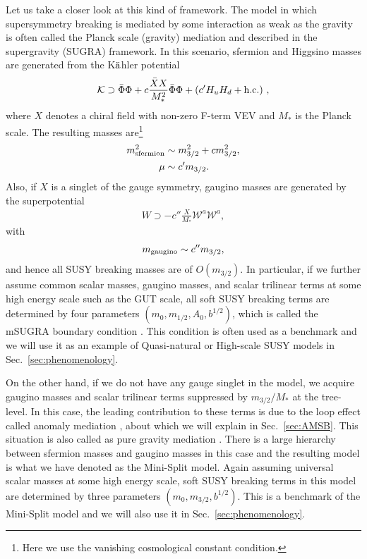 \documentclass[12pt,twoside,book]{article}
\begin{document}
Let us take a closer look at this kind of framework.  The model in which
supersymmetry breaking is mediated by some interaction as weak as the
gravity is often called the Planck scale (gravity) mediation
\cite{Chamseddine:1982jx, Barbieri:1982eh, Ibanez:1982ee, Hall:1983iz,
Ohta:1982wn, Ellis:1982wr, AlvarezGaume:1983gj} and described in the
supergravity (SUGRA) framework.  In this scenario, sfermion and Higgsino
masses are generated from the K${\rm \ddot{a}}$hler potential
\begin{align}
 \mathcal{K} \supset \bar{\Phi} \Phi + c \frac{\bar{X} X}{M_{*}^2}
 \bar{\Phi} \Phi + (c' H_u H_d + {\rm h.c.})\ ,
\end{align}
where $X$ denotes a chiral field with non-zero F-term VEV and $M_{*}$ is
the Planck scale.  The resulting masses are\footnote{Here we use the
vanishing cosmological constant condition.}
\begin{align}
 m_{\rm sfermion}^2 &\sim m_{3/2}^2 + c m_{3/2}^2, \\
 \mu &\sim c' m_{3/2}.
\end{align}
Also, if $X$ is a singlet of the gauge symmetry, gaugino masses are
generated by the superpotential
\begin{align}
 W \supset - c'' \frac{X}{M_{*}} \mathcal{W}^a \mathcal{W}^a,
\end{align}
with
\begin{align}
 m_{\rm gaugino} \sim c'' m_{3/2},
\end{align}
and hence all SUSY breaking masses are of $O(m_{3/2})$.  In particular,
if we further assume common scalar masses, gaugino masses, and scalar
trilinear terms at some high energy scale such as the GUT scale, all
soft SUSY breaking terms are determined by four parameters $(m_0,
m_{1/2}, A_0, b^{1/2})$, which is called the mSUGRA boundary condition
\cite{Nilles:1983ge, Kane:1993td}.  This condition is often used as a
benchmark and we will use it as an example of Quasi-natural or
High-scale SUSY models in Sec.\ \ref{sec:phenomenology}.

On the other hand, if we do not have any gauge singlet in the model, we
acquire gaugino masses and scalar trilinear terms suppressed by
$m_{3/2}/M_{*}$ at the tree-level.  In this case, the leading
contribution to these terms is due to the loop effect called anomaly
mediation \cite{Giudice:1998xp,Randall:1998uk}, about which we will
explain in Sec.\ \ref{sec:AMSB}.  This situation is also called as pure
gravity mediation \cite{Ibe:2006de, Ibe:2011aa, ArkaniHamed:2012gw}.
There is a large hierarchy between sfermion masses and gaugino masses in
this case and the resulting model is what we have denoted as the
Mini-Split model.  Again assuming universal scalar masses at some high
energy scale, soft SUSY breaking terms in this model are determined by
three parameters $(m_0, m_{3/2}, b^{1/2})$.  This is a benchmark of the
Mini-Split model and we will also use it in Sec.\
\ref{sec:phenomenology}.



\end{document}

